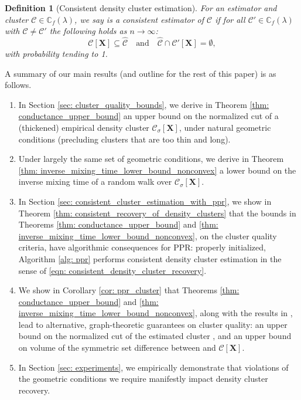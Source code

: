 \documentclass{article}
\newcommand{\1}{\mathbf{1}}
\newcommand{\Xbf}{\mathbf{X}}
\newcommand{\Cbb}{\mathbb{C}}
\newcommand{\Cset}{\mathcal{C}}
\newcommand{\Csig}{\Cset_{\sigma}}
\theoremstyle{aldenthm}
\newtheorem{definition}{Definition}
\theoremstyle{aldenrmrk}
\begin{document}
\begin{definition}[Consistent density cluster estimation]
\label{def: consistent_density_cluster_estimation}
For an estimator \smash{$\widehat{\Cset} \subseteq \Xbf$} and cluster 
$\Cset \in \Cbb_f(\lambda)$, we say \smash{$\widehat{\Cset}$} is a consistent
estimator of $\Cset$ if for all $\Cset' \in \Cbb_f(\lambda)$ with $\Cset \not=
\Cset'$ the following holds as $n \to \infty$: 
\begin{equation}
\label{eqn: consistent_density_cluster_recovery}
\Cset[\Xbf] \subseteq \widehat{\Cset} \quad \text{and} \quad
\widehat{\Cset} \cap \Cset'[\Xbf] = \emptyset,
\end{equation}
with probability tending to 1.
\end{definition}

A summary of our main results (and outline for the rest of this paper) is as
follows.  

\begin{enumerate}
\item In Section \ref{sec: cluster_quality_bounds}, we derive in Theorem
  \ref{thm: conductance_upper_bound} an upper bound on the normalized cut of a  
  (thickened) empirical density cluster $\Csig[\Xbf]$, under natural geometric 
  conditions (precluding clusters that are too thin and long).  

\item Under largely the same set of geometric conditions, we derive in Theorem
  \ref{thm: inverse_mixing_time_lower_bound_nonconvex} a lower bound on the
  inverse mixing time of a random walk over $\Csig[\Xbf]$.
	
\item In Section \ref{sec: consistent_cluster_estimation_with_ppr}, we show in
  Theorem \ref{thm: consistent_recovery_of_density_clusters} that the bounds
  in Theorems \ref{thm: conductance_upper_bound} and \ref{thm:
    inverse_mixing_time_lower_bound_nonconvex},
  on the cluster quality criteria, have algorithmic consequences for PPR:
  properly initialized, Algorithm \ref{alg: ppr} performs consistent density
  cluster estimation in the sense of \eqref{eqn:
    consistent_density_cluster_recovery}. 
	
\item We show in Corollary \ref{cor: ppr_cluster} that Theorems \ref{thm:
    conductance_upper_bound} and \ref{thm:
    inverse_mixing_time_lower_bound_nonconvex}, along with the results in 
  \citep{zhu2013}, lead to alternative, graph-theoretic guarantees on cluster 
  quality: an upper bound on the normalized cut of the estimated cluster 
  , and an upper bound on volume of the symmetric set
  difference between  and $\Cset[\Xbf]$.    

\item In Section \ref{sec: experiments}, we empirically
  demonstrate that violations of the geometric conditions we require manifestly
  impact density cluster recovery. 
\end{enumerate}
\end{document}

